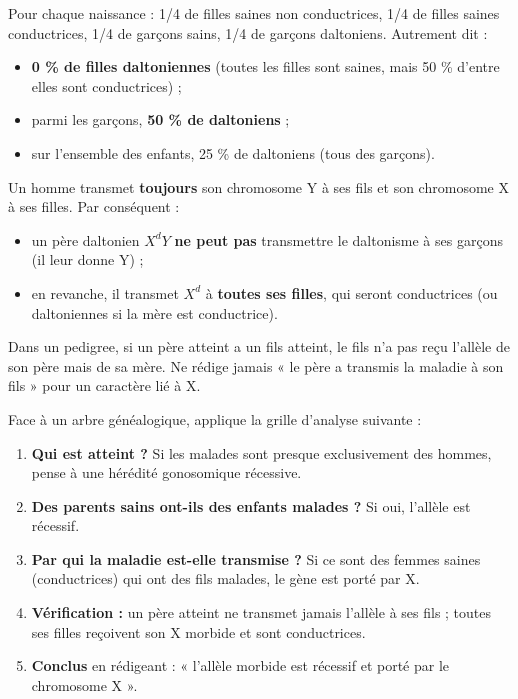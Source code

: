 \documentclass[11pt]{article}
\begin{document}
\begin{exemplebox}
Pour chaque naissance : 1/4 de filles saines non conductrices, 1/4 de filles saines conductrices, 1/4 de garçons sains, 1/4 de garçons daltoniens. Autrement dit :
\begin{itemize}
  \item \textbf{0 \% de filles daltoniennes} (toutes les filles sont saines, mais 50 \% d'entre elles sont conductrices) ;
  \item parmi les garçons, \textbf{50 \% de daltoniens} ;
  \item sur l'ensemble des enfants, 25 \% de daltoniens (tous des garçons).
\end{itemize}
\end{exemplebox}

\begin{attention}
Un homme transmet \textbf{toujours} son chromosome Y à ses fils et son chromosome X à ses filles. Par conséquent :
\begin{itemize}
  \item un père daltonien $X^{d}Y$ \textbf{ne peut pas} transmettre le daltonisme à ses garçons (il leur donne Y) ;
  \item en revanche, il transmet $X^{d}$ à \textbf{toutes ses filles}, qui seront conductrices (ou daltoniennes si la mère est conductrice).
\end{itemize}
Dans un pedigree, si un père atteint a un fils atteint, le fils n'a pas reçu l'allèle de son père mais de sa mère. Ne rédige jamais « le père a transmis la maladie à son fils » pour un caractère lié à X.
\end{attention}

\begin{methode}
Face à un arbre généalogique, applique la grille d'analyse suivante :
\begin{enumerate}
  \item \textbf{Qui est atteint ?} Si les malades sont presque exclusivement des hommes, pense à une hérédité gonosomique récessive.
  \item \textbf{Des parents sains ont-ils des enfants malades ?} Si oui, l'allèle est récessif.
  \item \textbf{Par qui la maladie est-elle transmise ?} Si ce sont des femmes saines (conductrices) qui ont des fils malades, le gène est porté par X.
  \item \textbf{Vérification :} un père atteint ne transmet jamais l'allèle à ses fils ; toutes ses filles reçoivent son X morbide et sont conductrices.
  \item \textbf{Conclus} en rédigeant : « l'allèle morbide est récessif et porté par le chromosome X ».
\end{enumerate}
\end{methode}
\end{document}
